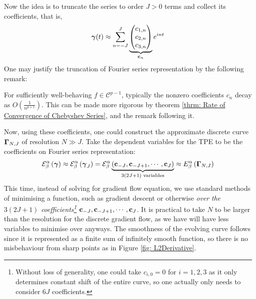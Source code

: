 \documentclass[../dissertation.tex]{subfiles}
\begin{document}
Now the idea is to truncate the series to order $J > 0$ terms and collect its coefficients,
that is,
\begin{equation*}
    \boldsymbol{\gamma}(t) \approx \sum_{n=-J}^{J}
    \underbrace{
    \begin{pmatrix}
        c_{1,n} \\
        c_{2,n} \\
        c_{3,n}
    \end{pmatrix}
}_{\mathbf{c}_n}
    e^{int}
\end{equation*}
One may justify the truncation of Fourier series representation by the following remark:
\begin{remark}
    For sufficiently well-behaving $f \in \mathcal{C}^{p-1}$, typically the nonzero coefficients $c_n$ decay as $O\left( \frac{1}{n^{p+1}} \right)$.
    This can be made more rigorous by theorem \ref{thrm: Rate of Convergence of Chebyshev Series},
    and the remark following it.
\end{remark}
Now, using these coefficients, one could construct the approximate discrete curve $\boldsymbol{\Gamma}_{N,J}$ of resolution $N \gg J$.
Take the dependent variables for the TPE to be the coefficients on Fourier series representation:
\begin{equation}
    \mathcal{E}_{\beta}^{\alpha} \left( \boldsymbol{\gamma} \right)
    \approx
    \mathcal{E}_{\beta}^{\alpha} \left( \boldsymbol{\gamma}_{J} \right)
    =
    \mathcal{E}_{\beta}^{\alpha} \underbrace{\left( \mathbf{c}_{-J}, \mathbf{c}_{-J+1}, \cdots, \mathbf{c}_{J} \right)}_{3\left( 2J+1 \right) \text{ variables}}
    \approx
    E_{\beta}^{\alpha} \left( \boldsymbol{\Gamma}_{N,J} \right)
\end{equation}
This time, instead of solving for gradient flow equation,
we use standard methods of minimising a function, such as gradient descent or otherwise \textit{over the $3(2J+1)$ coefficients\footnote{Without loss of generality, one could take $c_{i,0} = 0$ for $i=1,2,3$ as it only determines constant shift of the entire curve, so one actually only needs to consider $6J$ coefficients.}} $\mathbf{c}_{-J}, \mathbf{c}_{-J+1}, \cdots, \mathbf{c}_{J}$.
It is practical to take $N$ to be larger than the resolution for the discrete gradient flow,
as we have will have less variables to minimise over anyways.
The smoothness of the evolving curve follows since it is represented as a finite sum of infinitely smooth function,
so there is no misbehaviour from sharp points as in Figure \ref{fig: L2Derivative}.
\end{document}
